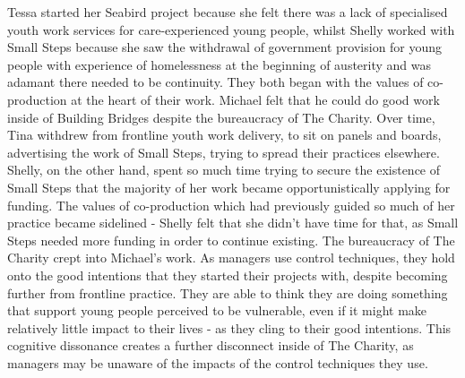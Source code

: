 Tessa started her Seabird project because she felt there was a lack of specialised youth work services for care-experienced young people, whilst Shelly worked with Small Steps because she saw the withdrawal of government provision for young people with experience of homelessness at the beginning of austerity and was adamant there needed to be continuity. They both began with the values of co-production at the heart of their work. Michael felt that he could do good work inside of Building Bridges despite the bureaucracy of The Charity. Over time, Tina withdrew from frontline youth work delivery, to sit on panels and boards, advertising the work of Small Steps, trying to spread their practices elsewhere. Shelly, on the other hand, spent so much time trying to secure the existence of Small Steps that the majority of her work became opportunistically applying for funding. The values of co-production which had previously guided so much of her practice became sidelined - Shelly felt that she didn't have time for that, as Small Steps needed more funding in order to continue existing. The bureaucracy of The Charity crept into Michael's work. As managers use control techniques, they hold onto the good intentions that they started their projects with, despite becoming further from frontline practice. They are able to think they are doing something that support young people perceived to be vulnerable, even if it might make relatively little impact to their lives - as they cling to their good intentions. This cognitive dissonance creates a further disconnect inside of The Charity, as managers may be unaware of the impacts of the control techniques they use. 







